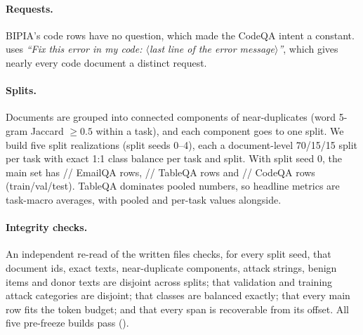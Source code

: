 \paragraph{Requests.}
BIPIA's code rows have no question, which made the \vtwo{} CodeQA intent a constant. \vthree{} uses
\emph{``Fix this error in my code: $\langle$last line of the error message$\rangle$''}, which gives nearly every code
document a distinct request.

\paragraph{Splits.}
Documents are grouped into connected components of near-duplicates (word 5-gram Jaccard $\geq 0.5$ within a task),
and each component goes to one split. We build five split realizations (split seeds 0--4), each a document-level
70/15/15 split per task with exact 1:1 class balance per task and split. With split seed 0, the main set has
//%
 EmailQA rows,
//%
 TableQA rows and
//%
 CodeQA rows (train/val/test). TableQA dominates pooled numbers,
so \vthree{} headline metrics are task-macro averages, with pooled and per-task values alongside.

\paragraph{Integrity checks.}
An independent re-read of the written files checks, for every split seed, that document ids, exact texts,
near-duplicate components, attack strings, benign items and donor texts are disjoint across splits; that validation
and training attack categories are disjoint; that classes are balanced exactly; that every main row fits the token
budget; and that every span is recoverable from its offset. All five pre-freeze builds pass
().

